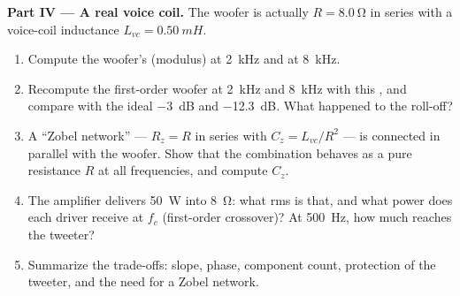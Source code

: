 \begin{problem}
\medskip
\noindent\textbf{Part IV --- A real voice coil.}
The woofer is actually $R = \qty{8.0}{\ohm}$ in series with a voice-coil
inductance $L_{vc} = \qty{0.50}{mH}$.
\begin{enumerate}[resume]
  \item Compute the woofer's  (modulus) at \qty{2}{kHz} and at
        \qty{8}{kHz}.
  \item Recompute the first-order woofer  at \qty{2}{kHz} and
        \qty{8}{kHz} with this , and compare with the ideal
        \qty{-3}{dB} and \qty{-12.3}{dB}. What happened to the roll-off?
  \item A ``Zobel network'' --- $R_z = R$ in series with $C_z =
        L_{vc}/R^2$ --- is connected in parallel with the woofer. Show
        that the combination behaves as a pure resistance $R$ at all
        frequencies, and compute $C_z$.
  \item The amplifier delivers \qty{50}{W} into \qty{8}{\ohm}: what rms
         is that, and what power does each driver receive at
        $f_c$ (first-order crossover)? At \qty{500}{Hz}, how much reaches
        the tweeter?
  \item Summarize the trade-offs: slope, phase, component count,
        protection of the tweeter, and the need for a Zobel network.
\end{enumerate}
\end{problem}
